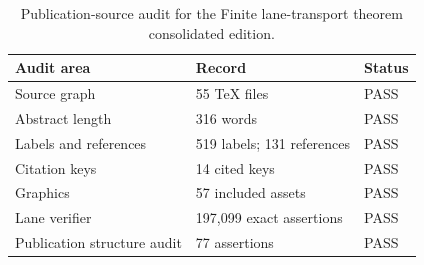 \begin{table}[htbp]
\centering
\small
\caption{Publication-source audit for the Finite lane-transport theorem consolidated edition.}
\label{tab:block15-publication-audit}
\begin{tabularx}{\textwidth}{@{}L{0.27\textwidth}YL{0.12\textwidth}@{}}
\toprule
Audit area & Record & Status \\
\midrule
Source graph & 55 TeX files & PASS \\
Abstract length & 316 words & PASS \\
Labels and references & 519 labels; 131 references & PASS \\
Citation keys & 14 cited keys & PASS \\
Graphics & 57 included assets & PASS \\
Lane verifier & 197,099 exact assertions & PASS \\
Publication structure audit & 77 assertions & PASS \\
\bottomrule
\end{tabularx}
\end{table}
